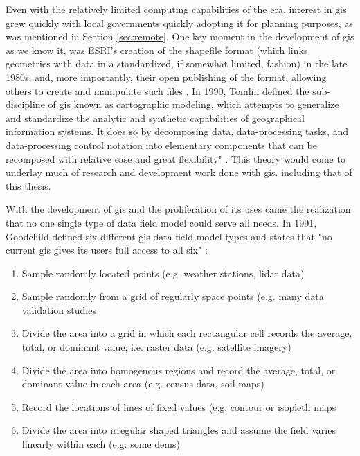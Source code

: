 Even with the relatively limited computing capabilities of the era, interest in \ac{gis} grew quickly with local governments quickly adopting it for planning purposes, as was mentioned in Section \ref{sec:remote}. One key moment in the development of \ac{gis} as we know it, was ESRI's creation of the shapefile format (which links geometries with data in a standardized, if somewhat limited, fashion) in the late 1980s, and, more importantly, their open publishing of the format, allowing others to create and manipulate such files \cite{goodchildModelingEarth2011}. In 1990, Tomlin defined the sub-discipline of \ac{gis} known as cartographic modeling, which attempts to generalize and standardize the analytic and synthetic capabilities of geographical information systems. It does so by decomposing data, data-processing tasks, and data-processing control notation into elementary components that can be recomposed with relative ease and great flexibility" \cite{tomlinGISCartographicModeling2012}. This theory would come to underlay much of research and development work done with \ac{gis}. including that of this thesis. 

With the development of \ac{gis} and the proliferation of its uses came the realization that no one single type of data field model could serve all needs. In 1991, Goodchild defined six different \ac{gis} data field model types and states that "no current \ac{gis} gives its users full access to all six" \cite{maguireGeographicalInformationSystems1991}:

\begin{enumerate}
    \setlength{\itemsep}{0pt}%
    \setlength{\parskip}{0pt}%
	\item{Sample randomly located points (e.g. weather stations, \ac{lidar} data)}
	\item{Sample randomly from a grid of regularly space points (e.g. many data validation studies}
	\item{Divide the area into a grid in which each rectangular cell records the average, total, or dominant value; i.e. raster data (e.g. satellite imagery)}
	\item{Divide the area into homogenous regions and record the average, total, or dominant value in each area (e.g. census data, soil maps)}
	\item{Record the locations of lines of fixed values (e.g. contour or isopleth maps}
	\item{Divide the area into irregular shaped triangles and assume the field varies linearly within each (e.g. some \acp{dem})}
\end{enumerate}

